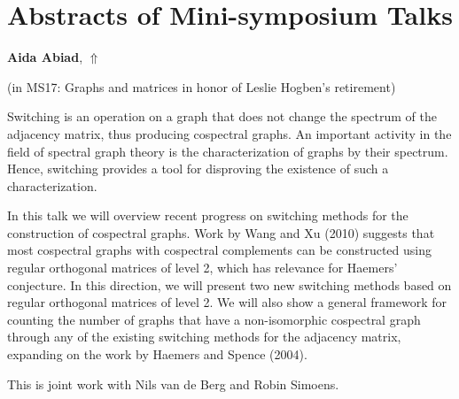 \documentclass[ILAS2025-program.tex]{subfiles}
\begin{document}
\section{Abstracts of Mini-symposium Talks}


\hypertarget{down0179}{}\begin{ilasabstract}
    
\textbf{Aida Abiad},  \hfill \hyperlink{up0179}{$\Uparrow$}
    
    
(in {\color{mstitle}MS17: Graphs and matrices in honor of Leslie Hogben's retirement})
        
\mtskip
    Switching is an operation on a graph that does not change the spectrum of the adjacency matrix, thus producing cospectral graphs. An important activity in the field of spectral graph theory is the characterization of graphs by their spectrum. Hence, switching provides a tool for disproving the existence of such a characterization. 

In this talk we will overview recent progress on switching methods for the construction of cospectral graphs. Work by Wang and Xu (2010) suggests that most cospectral graphs with cospectral complements can be constructed using regular orthogonal matrices of level 2, which has relevance for Haemers' conjecture. In this direction, we will present two new switching methods based on regular orthogonal matrices of level 2. We will also show a general framework for counting the number of graphs that have a non-isomorphic cospectral graph through any of the existing switching methods for the adjacency matrix, expanding on the work by Haemers and Spence (2004).  

This is joint work with Nils van de Berg and Robin Simoens.

\end{ilasabstract}
    
\end{document}
